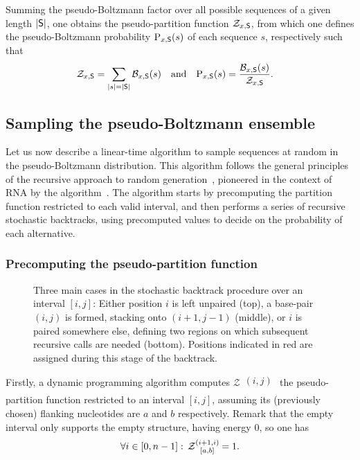 Summing the pseudo-Boltzmann factor over all possible sequences of a given length $|\text{\sf S}|$, one obtains the pseudo-partition function $\mathcal{Z}_{x,\text{\sf S}}$, from which one defines the pseudo-Boltzmann probability $\text{P}_{x,\text{\sf S}}(s)$ of each sequence $s$, respectively such that 
\begin{align}\mathcal{Z}_{x,\text{\sf S}} &= \sum_{\substack{|s|=|\text{\sf S}|}}\mathcal{B}_{x,\text{\sf S}}(s)& \text{and}&&
\text{P}_{x,\text{\sf S}}(s) &= \frac{\mathcal{B}_{x,\text{\sf S}}(s)}{\mathcal{Z}_{x,\text{\sf S}}}.\label{def:distribution}\end{align}

\subsection{Sampling the pseudo-Boltzmann ensemble}

Let us now describe a linear-time algorithm to sample sequences at random in the pseudo-Boltzmann distribution. This algorithm follows the general principles of the recursive approach to random generation~\cite{Wilf1977}, pioneered in the context of RNA by the \SFold algorithm~\cite{Ding2003}. The algorithm starts by precomputing the partition function restricted to each valid interval, and then performs a series of recursive stochastic backtracks, using precomputed values to decide on the probability of each alternative.

\subsubsection{Precomputing the pseudo-partition function}\label{sec:pf}
\begin{figure}
\resizebox{\textwidth}{!}{}
\caption{Three main cases in the stochastic backtrack procedure over an interval $[i,j]$: Either position $i$ is left unpaired (top), a base-pair $(i,j)$ is formed, stacking onto $(i+1,j-1)$ (middle), or $i$ is paired somewhere else, defining two regions on which subsequent recursive calls are needed (bottom). Positions indicated in red are assigned during this stage of the backtrack.\label{fig:stochastic}}
\end{figure}


Firstly, a dynamic programming algorithm computes $\mathcal{Z}\substack{(i,j)\\ [a,b]}$ the pseudo-partition function restricted to an interval $[i,j]$, assuming its (previously chosen) flanking nucleotides are $a$ and $b$ respectively. 
Remark that the empty interval only supports the empty structure, having energy $0$, so one has
\begin{equation}
	\forall i \in [0,n-1]:\, \Z{i+1,i}{a,b}=1.
	\label{eq:Z_in}
\end{equation}


